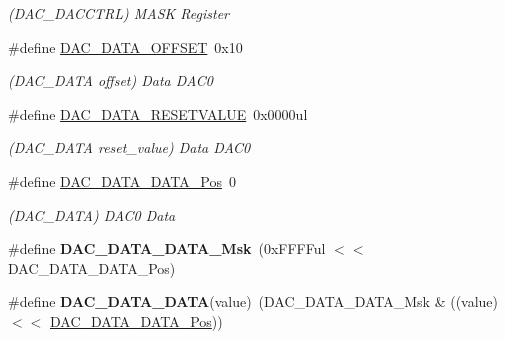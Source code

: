\begin{DoxyCompactItemize}
\begin{DoxyCompactList}\small\item\em (D\+A\+C\+\_\+\+D\+A\+C\+C\+T\+R\+L) M\+A\+S\+K Register \end{DoxyCompactList}\item 
\hypertarget{group___s_a_m_l21___d_a_c_ga927b65fb825b37f7f7b23d90604430be}{}\#define \hyperlink{group___s_a_m_l21___d_a_c_ga927b65fb825b37f7f7b23d90604430be}{D\+A\+C\+\_\+\+D\+A\+T\+A\+\_\+\+O\+F\+F\+S\+E\+T}~0x10\label{group___s_a_m_l21___d_a_c_ga927b65fb825b37f7f7b23d90604430be}

\begin{DoxyCompactList}\small\item\em (D\+A\+C\+\_\+\+D\+A\+T\+A offset) Data D\+A\+C0 \end{DoxyCompactList}\item 
\hypertarget{group___s_a_m_l21___d_a_c_ga18ce37ed9fbd7ceef65e3837f2ed73ec}{}\#define \hyperlink{group___s_a_m_l21___d_a_c_ga18ce37ed9fbd7ceef65e3837f2ed73ec}{D\+A\+C\+\_\+\+D\+A\+T\+A\+\_\+\+R\+E\+S\+E\+T\+V\+A\+L\+U\+E}~0x0000ul\label{group___s_a_m_l21___d_a_c_ga18ce37ed9fbd7ceef65e3837f2ed73ec}

\begin{DoxyCompactList}\small\item\em (D\+A\+C\+\_\+\+D\+A\+T\+A reset\+\_\+value) Data D\+A\+C0 \end{DoxyCompactList}\item 
\hypertarget{group___s_a_m_l21___d_a_c_gabb4ad33edb03cfa83cacba4fbfcae055}{}\#define \hyperlink{group___s_a_m_l21___d_a_c_gabb4ad33edb03cfa83cacba4fbfcae055}{D\+A\+C\+\_\+\+D\+A\+T\+A\+\_\+\+D\+A\+T\+A\+\_\+\+Pos}~0\label{group___s_a_m_l21___d_a_c_gabb4ad33edb03cfa83cacba4fbfcae055}

\begin{DoxyCompactList}\small\item\em (D\+A\+C\+\_\+\+D\+A\+T\+A) D\+A\+C0 Data \end{DoxyCompactList}\item 
\hypertarget{group___s_a_m_l21___d_a_c_ga171d99dfcf0786683343dee659c78c1f}{}\#define {\bfseries D\+A\+C\+\_\+\+D\+A\+T\+A\+\_\+\+D\+A\+T\+A\+\_\+\+Msk}~(0x\+F\+F\+F\+Ful $<$$<$ D\+A\+C\+\_\+\+D\+A\+T\+A\+\_\+\+D\+A\+T\+A\+\_\+\+Pos)\label{group___s_a_m_l21___d_a_c_ga171d99dfcf0786683343dee659c78c1f}

\item 
\hypertarget{group___s_a_m_l21___d_a_c_ga74d499bb7e6618526f4e7928cc871593}{}\#define {\bfseries D\+A\+C\+\_\+\+D\+A\+T\+A\+\_\+\+D\+A\+T\+A}(value)~(D\+A\+C\+\_\+\+D\+A\+T\+A\+\_\+\+D\+A\+T\+A\+\_\+\+Msk \& ((value) $<$$<$ \hyperlink{group___s_a_m_l21___d_a_c_gabb4ad33edb03cfa83cacba4fbfcae055}{D\+A\+C\+\_\+\+D\+A\+T\+A\+\_\+\+D\+A\+T\+A\+\_\+\+Pos}))\label{group___s_a_m_l21___d_a_c_ga74d499bb7e6618526f4e7928cc871593}


\end{DoxyCompactItemize}
